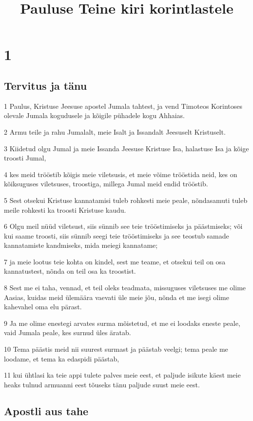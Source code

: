 

\title{Pauluse Teine kiri korintlastele}

\chapter{1}

\section*{Tervitus ja tänu}

\par 1 Paulus, Kristuse Jeesuse apostel Jumala tahtest, ja vend Timoteos Korintoses olevale Jumala kogudusele ja kõigile pühadele kogu Ahhaias.
\par 2 Armu teile ja rahu Jumalalt, meie Isalt ja Issandalt Jeesuselt Kristuselt.
\par 3 Kiidetud olgu Jumal ja meie Issanda Jeesuse Kristuse Isa, halastuse Isa ja kõige troosti Jumal,
\par 4 kes meid trööstib kõigis meie viletsusis, et meie võime trööstida neid, kes on kõiksuguses viletsuses, troostiga, millega Jumal meid endid trööstib.
\par 5 Sest otsekui Kristuse kannatamisi tuleb rohkesti meie peale, nõndasamuti tuleb meile rohkesti ka troosti Kristuse kaudu.
\par 6 Olgu meil nüüd viletsust, siis sünnib see teie trööstimiseks ja päästmiseks; või kui saame troosti, siis sünnib seegi teie trööstimiseks ja see teostub samade kannatamiste kandmiseks, mida meiegi kannatame;
\par 7 ja meie lootus teie kohta on kindel, sest me teame, et otsekui teil on osa kannatustest, nõnda on teil osa ka troostist.
\par 8 Sest me ei taha, vennad, et teil oleks teadmata, missuguses viletsuses me olime Aasias, kuidas meid ülemäära vaevati üle meie jõu, nõnda et me isegi olime kahevahel oma elu pärast.
\par 9 Ja me olime enestegi arvates surma mõistetud, et me ei loodaks eneste peale, vaid Jumala peale, kes surnud üles äratab.
\par 10 Tema päästis meid nii suurest surmast ja päästab veelgi; tema peale me loodame, et tema ka edaspidi päästab,
\par 11 kui ühtlasi ka teie appi tulete palves meie eest, et paljude isikute käest meie heaks tulnud armuanni eest tõuseks tänu paljude suust meie eest.

\section*{Apostli aus tahe}

